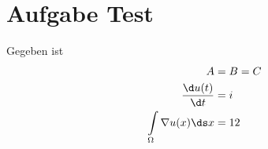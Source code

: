 
\section{Aufgabe Test}
	Gegeben ist
	\begin{align*}
		A&=B=C\\
		\frac{\d u(t)}{\d t}&= i\\
		\int\limits_\Omega\nabla u(x)\ds x&=12
	\end{align*}